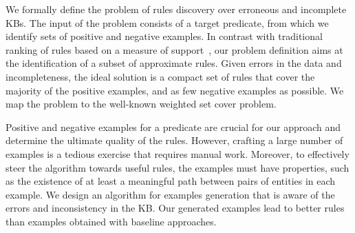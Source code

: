 \vspace{1ex}
We formally define the problem of rules discovery over erroneous and incomplete KBs. The input of the problem consists of a target predicate, from which we identify sets of positive and negative examples.  In contrast with traditional ranking of rules based on a measure of support~\cite{dehaspe1999discovery,galarraga2015fast,muggleton1995inverse,schoenmackers2010learning}, our  problem definition aims at the identification of a subset of approximate rules. %
Given errors in the data and incompleteness, the ideal solution is a compact set of rules that cover the majority of the positive examples, and as few negative examples as possible. We map the problem to the well-known weighted set cover problem.




Positive and negative examples for a predicate are crucial for our approach and determine the ultimate quality of the rules. However, crafting a large number of examples is a tedious exercise that requires manual work. Moreover, to effectively steer the algorithm towards useful rules, the examples must have properties, such as the existence of at least a meaningful path between pairs of entities in each example. We design an algorithm for examples generation that is aware of the errors and inconsistency in the KB. Our generated examples lead to better rules than examples obtained with baseline approaches. %

